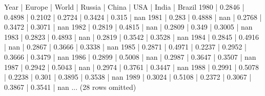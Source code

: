 \documentclass[letterpaper,10pt,english]{jupyterBook}
\begin{document}
\begin{sphinxVerbatim}[commandchars=\\\{\}]
  
   
   
   
\end{sphinxVerbatim}

\begin{sphinxVerbatim}[commandchars=\\\{\}]
Year | Europe | World  | Russia | China  | USA    | India  | Brazil
1980 | 0.2846 | 0.4898 | 0.2102 | 0.2724 | 0.3424 | 0.315  | nan
1981 | 0.283  | 0.4888 | nan    | 0.2768 | 0.3472 | 0.3071 | nan
1982 | 0.2819 | 0.4815 | nan    | 0.2809 | 0.349  | 0.3005 | nan
1983 | 0.2823 | 0.4893 | nan    | 0.2819 | 0.3542 | 0.3528 | nan
1984 | 0.2845 | 0.4916 | nan    | 0.2867 | 0.3666 | 0.3338 | nan
1985 | 0.2871 | 0.4971 | 0.2237 | 0.2952 | 0.3666 | 0.3479 | nan
1986 | 0.2899 | 0.5008 | nan    | 0.2987 | 0.3647 | 0.3507 | nan
1987 | 0.2942 | 0.5043 | nan    | 0.2974 | 0.3761 | 0.3447 | nan
1988 | 0.2991 | 0.5078 | 0.2238 | 0.301  | 0.3895 | 0.3538 | nan
1989 | 0.3024 | 0.5108 | 0.2372 | 0.3067 | 0.3867 | 0.3541 | nan
... (28 rows omitted)
\end{sphinxVerbatim}

\noindent{}
\end{document}
